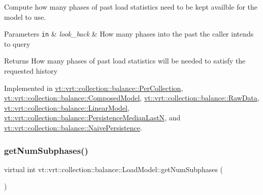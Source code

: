 Compute how many phases of past load statistics need to be kept availble for the model to use. 


\begin{DoxyParams}[1]{Parameters}
\mbox{\tt in}  & {\em look\+\_\+back} & How many phases into the past the caller intends to query\\
\hline
\end{DoxyParams}
\begin{DoxyReturn}{Returns}
How many phases of past load statistics will be needed to satisfy the requested history 
\end{DoxyReturn}


Implemented in \hyperlink{structvt_1_1vrt_1_1collection_1_1balance_1_1_per_collection_a1e2537d7294b8d1db3ed793d98dfb59c}{vt\+::vrt\+::collection\+::balance\+::\+Per\+Collection}, \hyperlink{classvt_1_1vrt_1_1collection_1_1balance_1_1_composed_model_abf2a02ff624e66c7076bfe3dce961981}{vt\+::vrt\+::collection\+::balance\+::\+Composed\+Model}, \hyperlink{structvt_1_1vrt_1_1collection_1_1balance_1_1_raw_data_a8f709c3aeaf10e92c746d773d7ba6f9c}{vt\+::vrt\+::collection\+::balance\+::\+Raw\+Data}, \hyperlink{structvt_1_1vrt_1_1collection_1_1balance_1_1_linear_model_a454177a512bbb73e246d3a7ad823c8e4}{vt\+::vrt\+::collection\+::balance\+::\+Linear\+Model}, \hyperlink{structvt_1_1vrt_1_1collection_1_1balance_1_1_persistence_median_last_n_accad4d2fe2cc3701966e13bbb5dd793c}{vt\+::vrt\+::collection\+::balance\+::\+Persistence\+Median\+LastN}, and \hyperlink{structvt_1_1vrt_1_1collection_1_1balance_1_1_naive_persistence_a7c4dcce4137f9c112a114686b6cbe691}{vt\+::vrt\+::collection\+::balance\+::\+Naive\+Persistence}.

\mbox{\label{classvt_1_1vrt_1_1collection_1_1balance_1_1_load_model_ab46ea62e4228d4a64de9dd0adfe81af2}} 
\subsubsection{\texorpdfstring{get\+Num\+Subphases()}{getNumSubphases()}}
{\footnotesize\ttfamily virtual int vt\+::vrt\+::collection\+::balance\+::\+Load\+Model\+::get\+Num\+Subphases (\begin{DoxyParamCaption}{ }\end{DoxyParamCaption})\hspace{0.3cm}{\ttfamily [pure virtual]}}

